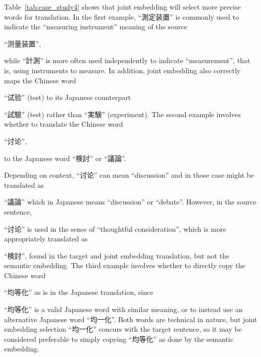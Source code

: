 \begin{CJK}{UTF8}{ipxm}
Table~\ref{tab:case_study4} shows that joint embedding will select more precise words for translation. In the first example, ``測定装置'' is commonly used to indicate the ``measuring instrument'' meaning of the source \end{CJK}\begin{CJK}{UTF8}{gbsn}``测量装置'', \end{CJK}\begin{CJK}{UTF8}{ipxm} while ``計測'' is more often used independently to indicate ``measurement'', that is, using instruments to measure. In addition, joint embedding also correctly maps the Chinese word \end{CJK}\begin{CJK}{UTF8}{gbsn}``试验'' (test) to its Japanese counterpart \end{CJK}\begin{CJK}{UTF8}{ipxm}``試驗'' (test) rather than ``実験'' (experiment). The second example involves whether to translate the Chinese word \end{CJK}\begin{CJK}{UTF8}{gbsn}``讨论'', \end{CJK}\begin{CJK}{UTF8}{ipxm} to the Japanese word ``検討'' or ``議論''. \end{CJK}\begin{CJK}{UTF8}{gbsn} Depending on context, ``讨论'' can mean ``discussion'' and in those case might be translated as \end{CJK}\begin{CJK}{UTF8}{ipxm}``議論'' which in Japanese means ``discussion'' or ``debate''. However, in the source sentence, \end{CJK}\begin{CJK}{UTF8}{gbsn}``讨论'' is used in the sense of ``thoughtful consideration'', which is more appropriately translated as \end{CJK}\begin{CJK}{UTF8}{ipxm} ``検討'', found in the target and joint embedding translation, but not the semantic embedding. The third example involves whether to directly copy the Chinese word \end{CJK}\begin{CJK}{UTF8}{gbsn}``均等化''
as is in the Japanese translation, since \end{CJK}\begin{CJK}{UTF8}{ipxm}``均等化'' is a valid Japanese word with similar meaning, or to instead use an alternative Japanese word \mbox{``均一化''}. Both words are technical in nature, but joint embedding selection ``均一化'' concurs with the target sentence, so it may be considered preferable to simply copying \mbox{``均等化''} as done by the semantic embedding.
\end{CJK}

